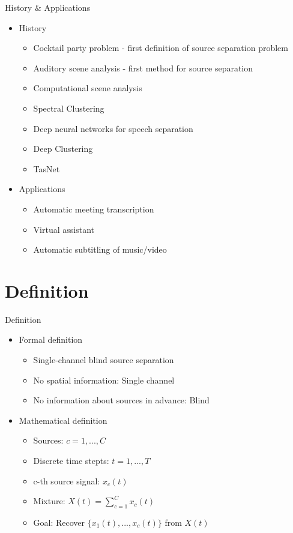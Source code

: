 \documentclass[xcolor=table,mathserif,9pt]{beamer}    %
\begin{document}
\begin{frame}{History \& Applications}

\begin{itemize}
	\setlength\itemsep{1em}
	\item History
	\begin{itemize}
		\item Cocktail party problem - first definition of source separation problem \cite{Cherry:1953} 
		\item Auditory scene analysis - first method for source separation \cite{bregman} 
		\item Computational scene analysis \cite{CASABrown} 
		\item Spectral Clustering \cite{Bach:2006} 
		\item Deep neural networks for speech separation \cite{SpeechSepDeepLearning:2015} 
		\item Deep Clustering \cite{DeepClustering2016}
		\item TasNet \cite{TasNet2017}
	\end{itemize}
	
	\item Applications
	\begin{itemize}
		\item Automatic meeting transcription 
		\item Virtual assistant
		\item Automatic subtitling of music/video
	\end{itemize}
\end{itemize}


\end{frame}

\section{Definition}%
\label{sec:definition}
\begin{frame}{Definition}

\begin{itemize}
	\setlength\itemsep{1em}
	\item Formal definition 
	\begin{itemize}
		\item Single-channel blind source separation
		\item No spatial information: Single channel
		\item No information about sources in advance: Blind
	\end{itemize}
	\item Mathematical definition
	\begin{itemize}
		\item Sources: $c = 1,...,C$
		\item Discrete time stepts: $t = 1,...,T$
		\item c-th source signal: $x_c(t)$
		\item Mixture: $X(t) = \sum_{c=1}^{C} x_c(t)$
		\item Goal: Recover $\{x_1(t),...,x_c(t)\}$ from $X(t)$
	\end{itemize}
\end{itemize}

\end{frame}
\end{document}

